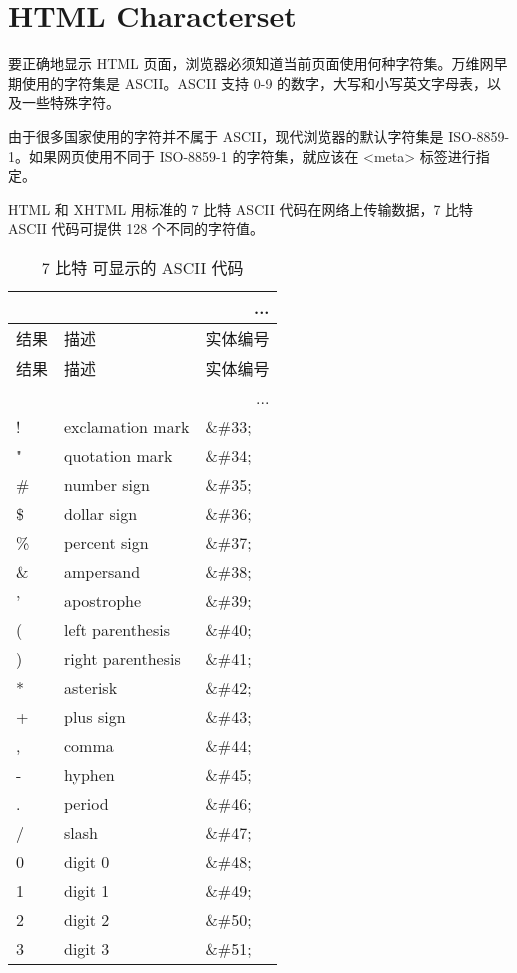 \part{HTML Characterset}

要正确地显示 HTML 页面，浏览器必须知道当前页面使用何种字符集。万维网早期使用的字符集是 ASCII。ASCII 支持 0-9 的数字，大写和小写英文字母表，以及一些特殊字符。

由于很多国家使用的字符并不属于 ASCII，现代浏览器的默认字符集是 ISO-8859-1。如果网页使用不同于 ISO-8859-1 的字符集，就应该在 <meta> 标签进行指定。


HTML 和 XHTML 用标准的 7 比特 ASCII 代码在网络上传输数据，7 比特 ASCII 代码可提供 128 个不同的字符值。

\begin{longtable}{|l|l|l|}
\multicolumn{3}{r}{...}
\tabularnewline\hline
结果		&描述		&实体编号			
\endhead
\caption{7 比特 可显示的 ASCII 代码}\\
\hline
结果		&描述		&实体编号	
\tabularnewline\hline
\endfirsthead
\multicolumn{3}{r}{...}
\endfoot
\endlastfoot
\hline
		&space			&\&\#32;\\
\hline
!		&exclamation mark	&\&\#33;\\
\hline	
"		&quotation mark	&\&\#34;\\
\hline
\#		&number sign		&\&\#35;\\
\hline
\$		&dollar sign		&\&\#36;\\
\hline
\%		&percent sign		&\&\#37;\\
\hline
\&	&ampersand			&\&\#38;\\
\hline
'	&apostrophe			&\&\#39;\\
\hline
(	&left parenthesis		&\&\#40;\\
\hline
)	&right parenthesis		&\&\#41;\\
\hline
*	&asterisk				&\&\#42;\\
\hline
+	&plus sign			&\&\#43;\\
\hline
,	&comma				&\&\#44;\\
\hline
-	&hyphen				&\&\#45;\\
\hline
.	&period				&\&\#46;\\
\hline
/	&slash				&\&\#47;\\
\hline
0	&digit 0				&\&\#48;\\
\hline
1	&digit 1				&\&\#49;\\
\hline
2	&digit 2				&\&\#50;\\
\hline
3	&digit 3				&\&\#51;\\
\hline

\end{longtable}
